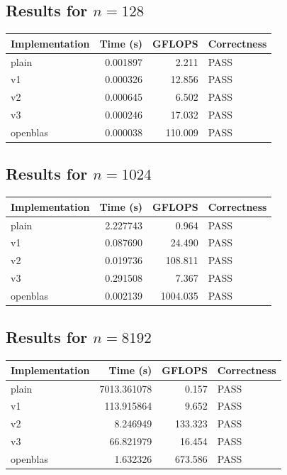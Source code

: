 \documentclass[11pt,a4paper]{article}
\begin{document}
\subsection{Results for \(n = 128\)}
\begin{center}
\begin{tabular}{lrrl}
\toprule
Implementation & Time (s) & GFLOPS & Correctness \\
\midrule
plain    & 0.001897    & 2.211    & PASS \\
v1       & 0.000326    & 12.856   & PASS \\
v2       & 0.000645    & 6.502    & PASS \\
v3       & 0.000246    & 17.032   & PASS \\
openblas & 0.000038    & 110.009  & PASS \\
\bottomrule
\end{tabular}
\end{center}

\subsection{Results for \(n = 1024\)}
\begin{center}
\begin{tabular}{lrrl}
\toprule
Implementation & Time (s) & GFLOPS & Correctness \\
\midrule
plain    & 2.227743    & 0.964     & PASS \\
v1       & 0.087690    & 24.490    & PASS \\
v2       & 0.019736    & 108.811   & PASS \\
v3       & 0.291508    & 7.367     & PASS \\
openblas & 0.002139    & 1004.035  & PASS \\
\bottomrule
\end{tabular}
\end{center}

\subsection{Results for \(n = 8192\)}
\begin{center}
\begin{tabular}{lrrl}
\toprule
Implementation & Time (s) & GFLOPS & Correctness \\
\midrule
plain    & 7013.361078  & 0.157    & PASS \\
v1       & 113.915864   & 9.652    & PASS \\
v2       & 8.246949     & 133.323  & PASS \\
v3       & 66.821979    & 16.454   & PASS \\
openblas & 1.632326     & 673.586  & PASS \\
\bottomrule
\end{tabular}
\end{center}
\end{document}
